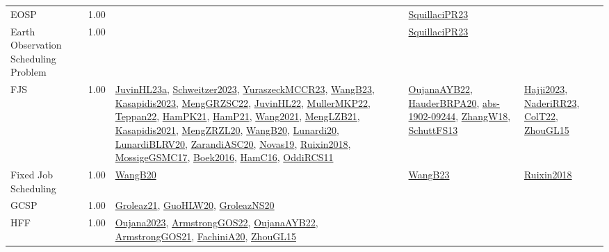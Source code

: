 {\begin{longtable}{p{3cm}r>{\raggedright\arraybackslash}p{6cm}>{\raggedright\arraybackslash}p{6cm}>{\raggedright\arraybackslash}p{8cm}}
\index{EOSP}\index{Classification!EOSP}EOSP &  1.00 &  & \hyperref[detail:SquillaciPR23]{SquillaciPR23} & \\
\index{Earth Observation Scheduling Problem}\index{Classification!Earth Observation Scheduling Problem}Earth Observation Scheduling Problem &  1.00 &  & \hyperref[detail:SquillaciPR23]{SquillaciPR23} & \\
\index{FJS}\index{Classification!FJS}FJS &  1.00 & \hyperref[detail:JuvinHL23a]{JuvinHL23a}, \hyperref[detail:Schweitzer2023]{Schweitzer2023}, \hyperref[detail:YuraszeckMCCR23]{YuraszeckMCCR23}, \hyperref[detail:WangB23]{WangB23}, \hyperref[detail:Kasapidis2023]{Kasapidis2023}, \hyperref[detail:MengGRZSC22]{MengGRZSC22}, \hyperref[detail:JuvinHL22]{JuvinHL22}, \hyperref[detail:MullerMKP22]{MullerMKP22}, \hyperref[detail:Teppan22]{Teppan22}, \hyperref[detail:HamPK21]{HamPK21}, \hyperref[detail:HamP21]{HamP21}, \hyperref[detail:Wang2021]{Wang2021}, \hyperref[detail:MengLZB21]{MengLZB21}, \hyperref[detail:Kasapidis2021]{Kasapidis2021}, \hyperref[detail:MengZRZL20]{MengZRZL20}, \hyperref[detail:WangB20]{WangB20}, \hyperref[detail:Lunardi20]{Lunardi20}, \hyperref[detail:LunardiBLRV20]{LunardiBLRV20}, \hyperref[detail:ZarandiASC20]{ZarandiASC20}, \hyperref[detail:Novas19]{Novas19}, \hyperref[detail:Ruixin2018]{Ruixin2018}, \hyperref[detail:MossigeGSMC17]{MossigeGSMC17}, \hyperref[detail:Boek2016]{Boek2016}, \hyperref[detail:HamC16]{HamC16}, \hyperref[detail:OddiRCS11]{OddiRCS11} & \hyperref[detail:OujanaAYB22]{OujanaAYB22}, \hyperref[detail:HauderBRPA20]{HauderBRPA20}, \hyperref[detail:abs-1902-09244]{abs-1902-09244}, \hyperref[detail:ZhangW18]{ZhangW18}, \hyperref[detail:SchuttFS13]{SchuttFS13} & \hyperref[detail:Hajji2023]{Hajji2023}, \hyperref[detail:NaderiRR23]{NaderiRR23}, \hyperref[detail:ColT22]{ColT22}, \hyperref[detail:ZhouGL15]{ZhouGL15}\\
\index{Fixed Job Scheduling}\index{Classification!Fixed Job Scheduling}Fixed Job Scheduling &  1.00 & \hyperref[detail:WangB20]{WangB20} & \hyperref[detail:WangB23]{WangB23} & \hyperref[detail:Ruixin2018]{Ruixin2018}\\
\index{GCSP}\index{Classification!GCSP}GCSP &  1.00 & \hyperref[detail:Groleaz21]{Groleaz21}, \hyperref[detail:GuoHLW20]{GuoHLW20}, \hyperref[detail:GroleazNS20]{GroleazNS20} &  & \\
\index{HFF}\index{Classification!HFF}HFF &  1.00 & \hyperref[detail:Oujana2023]{Oujana2023}, \hyperref[detail:ArmstrongGOS22]{ArmstrongGOS22}, \hyperref[detail:OujanaAYB22]{OujanaAYB22}, \hyperref[detail:ArmstrongGOS21]{ArmstrongGOS21}, \hyperref[detail:FachiniA20]{FachiniA20}, \hyperref[detail:ZhouGL15]{ZhouGL15} &  & \\

\end{longtable}}
